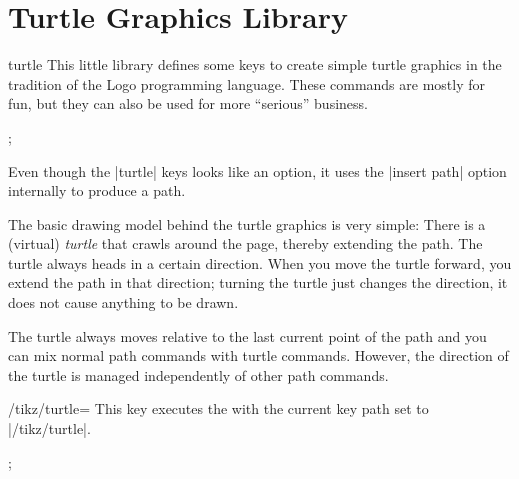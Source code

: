 %
%
%


\section{Turtle Graphics Library}
\label{section-library-tutrle}

\begin{pgflibrary}{turtle}
    This little library defines some keys to create simple turtle graphics in
    the tradition of the Logo programming language. These commands are mostly
    for fun, but they can also be used for more ``serious'' business.
\begin{codeexample}
    \usetikzlibrary{turtle}
\end{codeexample}
\begin{codeexample}[]
\tikz[turtle/distance=2mm]
  \draw [turtle={home,forward,right,forward,left,forward,left,forward}];
\end{codeexample}
\end{pgflibrary}

Even though the |turtle| keys looks like an option, it uses the |insert path|
option internally to produce a path.

The basic drawing model behind the turtle graphics is very simple: There is a
(virtual) \emph{turtle} that crawls around the page, thereby extending the
path. The turtle always heads in a certain direction. When you move the turtle
forward, you extend the path in that direction; turning the turtle just changes
the direction, it does not cause anything to be drawn.

The turtle always moves relative to the last current point of the path and you
can mix normal path commands with turtle commands. However, the direction of
the turtle is managed independently of other path commands.

\begin{key}{/tikz/turtle=}
    This key executes the  with the current key path set to
    |/tikz/turtle|.
\begin{codeexample}[]
\tikz[turtle/distance=2mm]
  \draw [turtle={home,fd,rt,fd,lt,fd,lt,fd}];
\end{codeexample}
\end{key}

